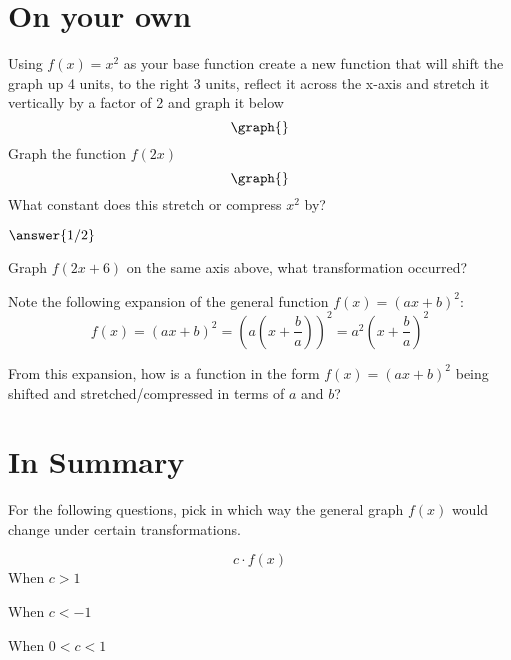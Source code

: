 \documentclass{ximera}
\begin{document}
\section{On your own}
\begin{question}
Using $f(x) = x^2$ as your base function create a new function that will shift the graph up 4 units, to the right 3 units, reflect it across the x-axis and stretch it vertically by a factor of 2 and graph it below
\[
\graph{}
\]
Graph the function $f(2x)$
\[
\graph{}
\]
What constant does this stretch or compress $x^2$ by?

$\answer{1/2}$

Graph $f(2x+6)$ on the same axis above, what transformation occurred?
\begin{freeResponse}
\end{freeResponse}
Note the following expansion of the general function $f(x)=(ax+b)^2$: $$\displaystyle f(x)=\left(ax+b\right)^2=\left(a\left(x+\frac{b}{a}\right)\right)^2=a^2\left(x+\frac{b}{a}\right)^2$$

From this expansion, how is a function in the form $f(x)=(ax+b)^2$ being shifted and stretched/compressed in terms of $a$ and $b$?
\begin{freeResponse}
\end{freeResponse}

\end{question}
\section{In Summary}

For the following questions, pick in which way the general graph $f(x)$ would change under certain transformations.

\begin{question}
$$c \cdot f(x)$$
When $c>1$

\begin{multipleChoice}
\end{multipleChoice}

When $c<-1$

\begin{multipleChoice}
\end{multipleChoice}

When $0<c<1$

\begin{multipleChoice}
\end{multipleChoice}
\end{question}
\end{document}
